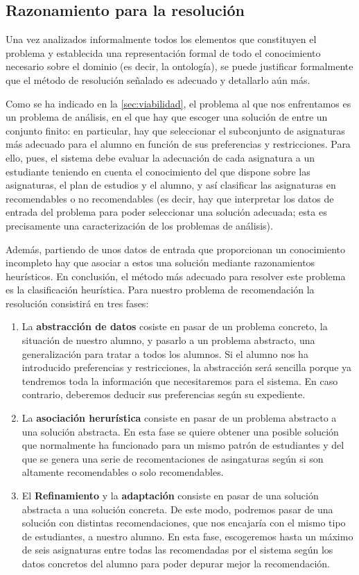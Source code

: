 
\subsection{Razonamiento para la resolución} \label{sec:razonamiento}

Una vez analizados informalmente todos los elementos que constituyen el 
problema y establecida una representación formal de todo el conocimiento 
necesario sobre el dominio (es decir, la ontología), se puede justificar 
formalmente que el método de resolución señalado es adecuado y detallarlo 
aún más.

Como se ha indicado en la \autoref{sec:viabilidad}, el problema al que nos 
enfrentamos es un problema de análisis, en el que hay que escoger una solución
de entre un conjunto finito: en particular, hay que seleccionar el subconjunto 
de asignaturas más adecuado para el alumno en función de sus preferencias y 
restricciones. Para ello, pues, el sistema debe evaluar la adecuación de 
cada asignatura a un estudiante teniendo en cuenta el conocimiento del que 
dispone sobre las asignaturas, el plan de estudios y el alumno, y así 
clasificar las asignaturas en recomendables o no recomendables (es decir, hay 
que interpretar los datos de entrada del problema para poder seleccionar una 
solución adecuada; esta es precisamente una caracterización de los problemas 
de análisis).

Además, partiendo de unos datos de entrada que proporcionan un conocimiento 
incompleto hay que asociar a estos una solución mediante razonamientos 
heurísticos. En conclusión, el método más adecuado para resolver este problema 
es la clasificación heurística. Para nuestro problema de recomendación la 
resolución consistirá en tres fases:

\begin{enumerate}
\item La \textbf{abstracción de datos} cosiste en pasar de un problema concreto, 
la situación de nuestro alumno, y pasarlo a un problema abstracto, una 
generalización para tratar a todos los alumnos. Si el alumno nos ha introducido 
preferencias y restricciones, la abstracción será sencilla porque ya tendremos 
toda la información que necesitaremos para el sistema. En caso contrario, 
deberemos deducir sus preferencias según su expediente.
\item La \textbf{asociación herurística} consiste en pasar de un problema 
abstracto a una solución abstracta. En esta fase se quiere obtener una posible 
solución que normalmente ha funcionado para un mismo patrón de estudiantes y 
del que se genera una serie de recomentaciones de asingaturas según si son 
altamente recomendables o solo recomendables.
\item El \textbf{Refinamiento} y la \textbf{adaptación} consiste en pasar de 
una solución abstracta a una solución concreta. De este modo, podremos pasar 
de una solución con distintas recomendaciones, que nos encajaría con el mismo 
tipo de estudiantes, a nuestro alumno. En esta fase, escogeremos hasta un 
máximo de seis asignaturas entre todas las recomendadas por el sistema según 
los datos concretos del alumno para poder depurar mejor la recomendación.
\end{enumerate}
